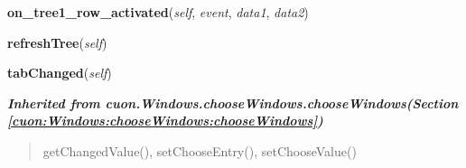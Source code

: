     \vspace{0.5ex}

\hspace{.8\funcindent}\begin{boxedminipage}{\funcwidth}

    \raggedright \textbf{on\_tree1\_row\_activated}(\textit{self}, \textit{event}, \textit{data1}, \textit{data2})

\setlength{\parskip}{2ex}
\setlength{\parskip}{1ex}
    \end{boxedminipage}

    \label{cuon:Articles:materialgroup:materialgroupwindow:refreshTree}

    \vspace{0.5ex}

\hspace{.8\funcindent}\begin{boxedminipage}{\funcwidth}

    \raggedright \textbf{refreshTree}(\textit{self})

\setlength{\parskip}{2ex}
\setlength{\parskip}{1ex}
    \end{boxedminipage}

    \label{cuon:Articles:materialgroup:materialgroupwindow:tabChanged}

    \vspace{0.5ex}

\hspace{.8\funcindent}\begin{boxedminipage}{\funcwidth}

    \raggedright \textbf{tabChanged}(\textit{self})

\setlength{\parskip}{2ex}
\setlength{\parskip}{1ex}
    \end{boxedminipage}


\large{\textbf{\textit{Inherited from cuon.Windows.chooseWindows.chooseWindows\textit{(Section \ref{cuon:Windows:chooseWindows:chooseWindows})}}}}

\begin{quote}
getChangedValue(), setChooseEntry(), setChooseValue()
\end{quote}

